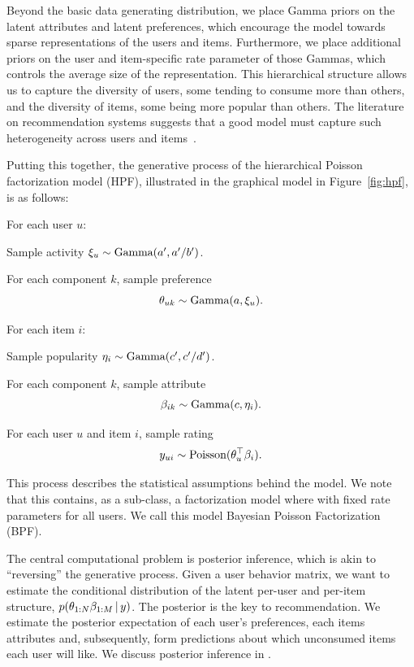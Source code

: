 Beyond the basic data generating distribution, we place Gamma priors
on the latent attributes and latent preferences, which encourage the
model towards sparse representations of the users and items.
Furthermore, we place additional priors on the user and item-specific
rate parameter of those Gammas, which controls the average size of the
representation.  This hierarchical structure allows us to capture the
diversity of users, some tending to consume more than others, and the
diversity of items, some being more popular than others.  The
literature on recommendation systems suggests that a good model must
capture such heterogeneity across users and items~\cite{Koren:2009}.

Putting this together, the generative process of the hierarchical
Poisson factorization model (HPF), illustrated in
the graphical model in Figure~\ref{fig:hpf}, is as follows:
\begin{enumerate*}
\item For each user $u$:
  \begin{enumerate*}
  \item Sample activity $\xi_u \sim \textrm{Gamma}(a', a'/b')$.
  \item For each component $k$, sample preference $$\theta_{uk} \sim
    \textrm{Gamma}(a, \xi_u).$$
  \end{enumerate*}

\item For each item $i$:
  \begin{enumerate*}
    \item Sample popularity $\eta_i \sim \textrm{Gamma}(c', c'/d')$.
    \item For each component $k$, sample attribute
      $$\beta_{ik} \sim \textrm{Gamma}(c, \eta_i).$$
  \end{enumerate*}

\item For each user $u$ and item $i$, sample rating
  $$y_{ui} \sim
  \textrm{Poisson}(\theta_u^\top \beta_i).$$
\end{enumerate*}
This process describes the statistical assumptions behind the model.
We note that this contains, as a sub-class, a factorization model
where with fixed rate parameters for all users. We call this model
Bayesian Poisson Factorization (BPF).

The central computational problem is posterior inference, which is
akin to ``reversing'' the generative process.  Given a user behavior
matrix, we want to estimate the conditional distribution of the latent
per-user and per-item structure, $p(\theta_{1:N} \beta_{1:M} \,\vert\, y)$.
The posterior is the key to recommendation.  We estimate the posterior
expectation of each user's preferences, each items attributes and,
subsequently, form predictions about which unconsumed items each user
will like.  We discuss posterior inference in
.


